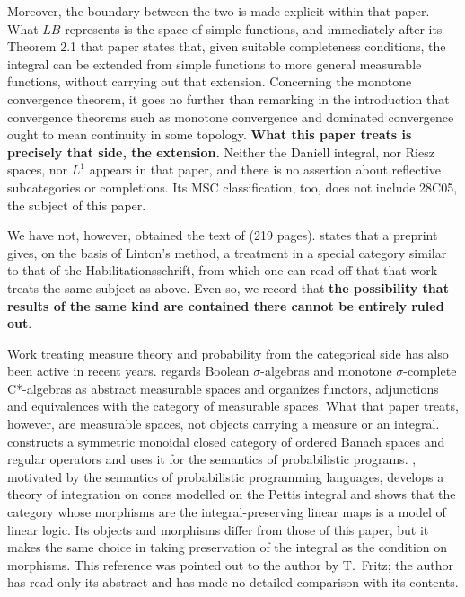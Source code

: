 Moreover, the boundary between the two is made explicit within that paper.
What $LB$ represents is the space of simple functions, and immediately after its
Theorem 2.1 that paper states that, given suitable completeness conditions, the
integral can be extended from simple functions to more general measurable
functions, without carrying out that extension.
Concerning the monotone convergence theorem, it goes no further than remarking in
the introduction that convergence theorems such as monotone convergence and
dominated convergence ought to mean continuity in some topology.
\textbf{What this paper treats is precisely that side, the extension.}
Neither the Daniell integral, nor Riesz spaces, nor $L^1$ appears in that paper,
and there is no assertion about reflective subcategories or completions.
Its MSC classification, too, does not include 28C05, the subject of this paper.

We have not, however, obtained the text of \cite{BorgerHabil} (219 pages).
\cite{Borger2010} states that a preprint gives, on the basis of Linton's method,
a treatment in a special category similar to that of the
Habilitationsschrift, from which one can read off that that work treats the same
subject as above.
Even so, we record that \textbf{the possibility that results of the same kind are
contained there cannot be entirely ruled out}.

Work treating measure theory and probability from the categorical side has also
been active in recent years.
\cite{FritzLorenzin} regards Boolean $\sigma$-algebras and monotone
$\sigma$-complete C*-algebras as abstract measurable spaces and organizes
functors, adjunctions and equivalences with the category of measurable spaces.
What that paper treats, however, are measurable spaces, not objects carrying a
measure or an integral.
\cite{DahlqvistKozen} constructs a symmetric monoidal closed category of ordered
Banach spaces and regular operators and uses it for the semantics of
probabilistic programs.
\cite{EhrhardGeoffroy}, motivated by the semantics of probabilistic programming
languages, develops a theory of integration on cones modelled on the Pettis
integral and shows that the category whose morphisms are the integral-preserving
linear maps is a model of linear logic.
Its objects and morphisms differ from those of this paper, but it makes the same
choice in taking preservation of the integral as the condition on morphisms.
This reference was pointed out to the author by T.~Fritz; the author has read
only its abstract and has made no detailed comparison with its contents.

